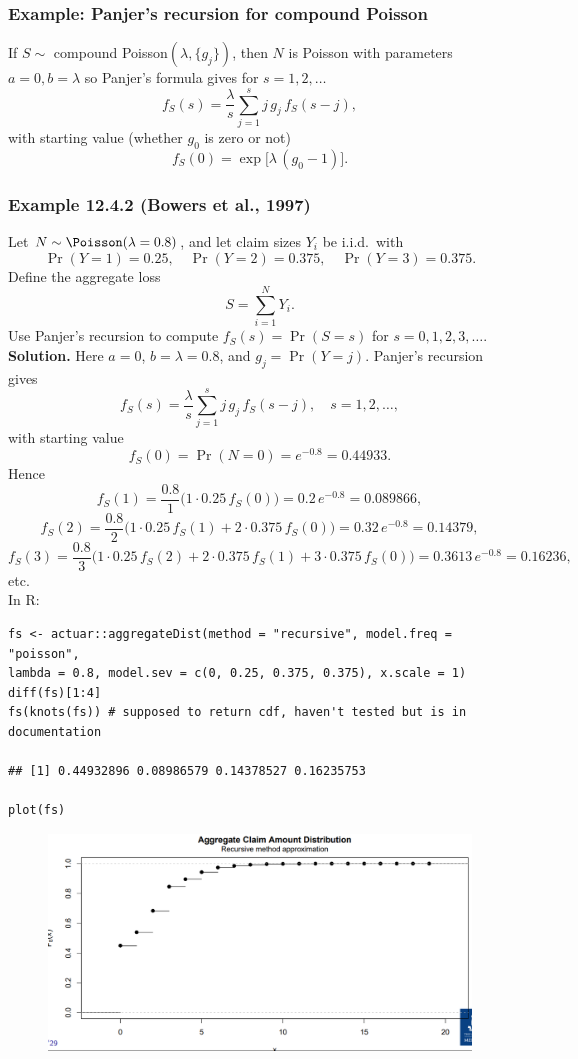 \documentclass[11pt]{article}
\newcommand{\noi}{\noindent}
\begin{document}
\subsubsection*{Example: Panjer’s recursion for compound Poisson}
\noi If \(S\sim\) compound Poisson\((\lambda,\{g_j\})\), then \(N\) is Poisson with parameters \(a=0,b=\lambda\) so Panjer’s formula gives for \(s=1,2,\dots\)
\[
f_S(s)
=\frac{\lambda}{s}
\sum_{j=1}^{s}j\,g_j\,f_S(s-j),
\]
with starting value (whether \(g_0\) is zero or not)
\[
f_S(0)
=\exp\!\bigl[\lambda\,(g_0-1)\bigr].
\]

\subsubsection*{Example 12.4.2 (Bowers et al., 1997)}
\noi Let \(N\sim\Poisson(\lambda=0.8)\), and let claim sizes \(Y_i\) be i.i.d.\ with
\[
\Pr(Y=1)=0.25,\quad
\Pr(Y=2)=0.375,\quad
\Pr(Y=3)=0.375.
\]
Define the aggregate loss
\[
S=\sum_{i=1}^N Y_i.
\]
Use Panjer’s recursion to compute \(f_S(s)=\Pr(S=s)\) for \(s=0,1,2,3,\dots\). \\

\noi\textbf{Solution.}  Here \(a=0\), \(b=\lambda=0.8\), and \(g_j=\Pr(Y=j)\).  Panjer’s recursion gives
\[
f_S(s)
=\frac{\lambda}{s}\sum_{j=1}^{s}j\,g_j\,f_S(s-j),
\quad s=1,2,\dots,
\]
with starting value
\[
f_S(0)=\Pr(N=0)=e^{-0.8}=0.44933.
\]
Hence
\[
f_S(1)
=\frac{0.8}{1}\bigl(1\cdot0.25\,f_S(0)\bigr)
=0.2\,e^{-0.8}
=0.089866,
\]
\[
f_S(2)
=\frac{0.8}{2}\bigl(1\cdot0.25\,f_S(1)+2\cdot0.375\,f_S(0)\bigr)
=0.32\,e^{-0.8}
=0.14379,
\]
\[
f_S(3)
=\frac{0.8}{3}\bigl(1\cdot0.25\,f_S(2)+2\cdot0.375\,f_S(1)+3\cdot0.375\,f_S(0)\bigr)
=0.3613\,e^{-0.8}
=0.16236,
\]
etc. \\

\noi In R:
\begin{lstlisting}
fs <- actuar::aggregateDist(method = "recursive", model.freq = "poisson",
lambda = 0.8, model.sev = c(0, 0.25, 0.375, 0.375), x.scale = 1)
diff(fs)[1:4]
fs(knots(fs)) # supposed to return cdf, haven't tested but is in documentation

## [1] 0.44932896 0.08986579 0.14378527 0.16235753

plot(fs)
\end{lstlisting}

\begin{figure}[H]
    \centering
    \includegraphics[width=0.75\linewidth]{Panjer Recursion Aggregate Claim Example.png}
\end{figure}
\end{document}
